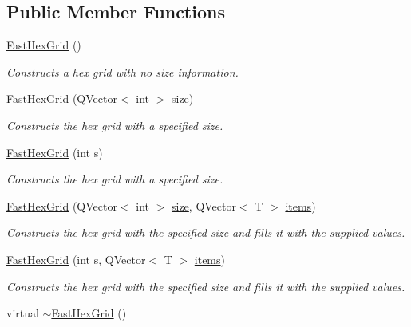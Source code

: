 \subsection*{\-Public \-Member \-Functions}
\begin{DoxyCompactItemize}
\item 
\hypertarget{classhsom_1_1_fast_hex_grid_a7d82cd1ac4c97eac37fd7bf0579d16a3}{\hyperlink{classhsom_1_1_fast_hex_grid_a7d82cd1ac4c97eac37fd7bf0579d16a3}{\-Fast\-Hex\-Grid} ()}\label{classhsom_1_1_fast_hex_grid_a7d82cd1ac4c97eac37fd7bf0579d16a3}

\begin{DoxyCompactList}\small\item\em \-Constructs a hex grid with no size information. \end{DoxyCompactList}\item 
\hyperlink{classhsom_1_1_fast_hex_grid_aec7541c31bf2b26837cdbf887d66fa5a}{\-Fast\-Hex\-Grid} (\-Q\-Vector$<$ int $>$ \hyperlink{classhsom_1_1_grid_a3e846473299eb2c7c259659eb61a6234}{size})
\begin{DoxyCompactList}\small\item\em \-Constructs the hex grid with a specified size. \end{DoxyCompactList}\item 
\hyperlink{classhsom_1_1_fast_hex_grid_a09b2f049297965971e33ea7d6e583da3}{\-Fast\-Hex\-Grid} (int s)
\begin{DoxyCompactList}\small\item\em \-Constructs the hex grid with a specified size. \end{DoxyCompactList}\item 
\hyperlink{classhsom_1_1_fast_hex_grid_a9dc41236780c5544948dfe3dd5cccf3e}{\-Fast\-Hex\-Grid} (\-Q\-Vector$<$ int $>$ \hyperlink{classhsom_1_1_grid_a3e846473299eb2c7c259659eb61a6234}{size}, \-Q\-Vector$<$ \-T $>$ \hyperlink{classhsom_1_1_grid_ae6b6ffb72e86c3904e8ac21253d85a24}{items})
\begin{DoxyCompactList}\small\item\em \-Constructs the hex grid with the specified size and fills it with the supplied values. \end{DoxyCompactList}\item 
\hyperlink{classhsom_1_1_fast_hex_grid_ad8e600cd2711e0882b3a97a3facbca8e}{\-Fast\-Hex\-Grid} (int s, \-Q\-Vector$<$ \-T $>$ \hyperlink{classhsom_1_1_grid_ae6b6ffb72e86c3904e8ac21253d85a24}{items})
\begin{DoxyCompactList}\small\item\em \-Constructs the hex grid with the specified size and fills it with the supplied values. \end{DoxyCompactList}\item 
\hypertarget{classhsom_1_1_fast_hex_grid_a9afacd0fd3f937ff69f14b196bef9cfa}{virtual \hyperlink{classhsom_1_1_fast_hex_grid_a9afacd0fd3f937ff69f14b196bef9cfa}{$\sim$\-Fast\-Hex\-Grid} ()}\label{classhsom_1_1_fast_hex_grid_a9afacd0fd3f937ff69f14b196bef9cfa}


\end{DoxyCompactItemize}

